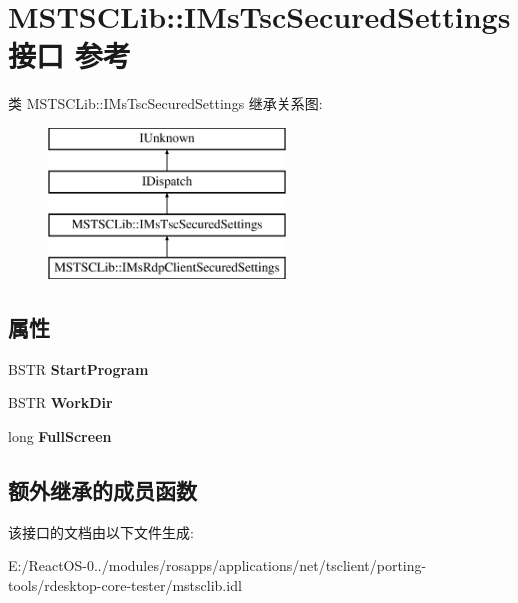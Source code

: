 \hypertarget{interface_m_s_t_s_c_lib_1_1_i_ms_tsc_secured_settings}{}\section{M\+S\+T\+S\+C\+Lib\+:\+:I\+Ms\+Tsc\+Secured\+Settings接口 参考}
\label{interface_m_s_t_s_c_lib_1_1_i_ms_tsc_secured_settings}
类 M\+S\+T\+S\+C\+Lib\+:\+:I\+Ms\+Tsc\+Secured\+Settings 继承关系图\+:\begin{figure}[H]
\begin{center}
\leavevmode
\includegraphics[height=4.000000cm]{interface_m_s_t_s_c_lib_1_1_i_ms_tsc_secured_settings}
\end{center}
\end{figure}
\subsection*{属性}
\begin{DoxyCompactItemize}
\item 
\mbox{\label{interface_m_s_t_s_c_lib_1_1_i_ms_tsc_secured_settings_a475a944e8c85fb384523230d86babbea}} 
B\+S\+TR {\bfseries Start\+Program}
\item 
\mbox{\label{interface_m_s_t_s_c_lib_1_1_i_ms_tsc_secured_settings_a268484a094470d7338a029fd6949eb53}} 
B\+S\+TR {\bfseries Work\+Dir}
\item 
\mbox{\label{interface_m_s_t_s_c_lib_1_1_i_ms_tsc_secured_settings_a8052a32f122ff3e6a4ea6639e3391758}} 
long {\bfseries Full\+Screen}
\end{DoxyCompactItemize}
\subsection*{额外继承的成员函数}


该接口的文档由以下文件生成\+:\begin{DoxyCompactItemize}
\item 
E\+:/\+React\+O\+S-\/0../modules/rosapps/applications/net/tsclient/porting-\/tools/rdesktop-\/core-\/tester/mstsclib.\+idl\end{DoxyCompactItemize}
